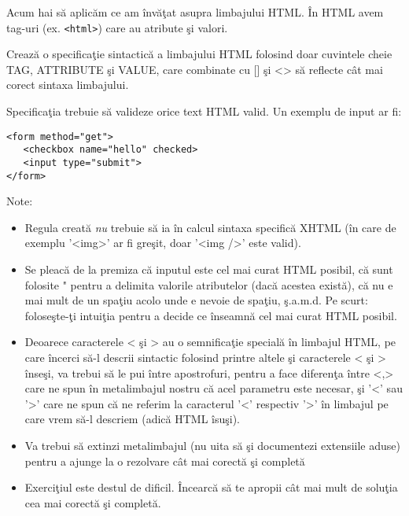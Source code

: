 \begin{Exercise}[title={Sintaxa HTML},label={ex:sintaxa_html},difficulty=3]
Acum hai să aplicăm ce am învăţat asupra limbajului HTML. În HTML avem
tag-uri (ex. \texttt{<html>}) care au atribute şi valori.

\Question Crează o specificaţie sintactică a limbajului HTML folosind
doar cuvintele cheie TAG, ATTRIBUTE şi VALUE, care combinate
cu [] şi <> să reflecte cât mai corect sintaxa limbajului.

Specificaţia trebuie să valideze orice text HTML valid.
Un exemplu de input ar fi:
\begin{verbatim}
<form method="get">
   <checkbox name="hello" checked>
   <input type="submit">
</form>
\end{verbatim}
\ExeText
Note:
\begin{itemize}
\item Regula creată \textit{nu} trebuie să ia în calcul sintaxa
specifică XHTML (în care de exemplu '<img>' ar fi greşit, doar '<img />' este valid).
\item Se pleacă de la premiza că inputul este cel mai curat HTML posibil, că
sunt folosite " pentru a delimita valorile atributelor (dacă acestea există), că
nu e mai mult de un spaţiu acolo unde e nevoie de spaţiu, ş.a.m.d. Pe scurt:
foloseşte-ţi intuiţia pentru a decide ce înseamnă {\glqq}cel mai curat HTML posibil{\grqq}.
\item Deoarece caracterele < şi > au o semnificaţie specială în limbajul HTML, pe
care încerci să-l descrii sintactic folosind printre altele
şi caracterele < şi > înseşi, va trebui să le pui între apostrofuri, pentru a face
diferenţa între <,> care ne spun în metalimbajul nostru
că acel parametru este necesar, şi '<' sau '>' care
ne spun că ne referim la caracterul '<' respectiv '>' în limbajul pe care
vrem să-l descriem (adică HTML îsuşi).
\item Va trebui să extinzi metalimbajul (nu uita să şi documentezi extensiile aduse)
pentru a ajunge la o rezolvare cât mai corectă şi completă
\item Exerciţiul este destul de dificil. Încearcă să te apropii cât mai mult de soluţia
cea mai corectă şi completă.
\end{itemize}
\end{Exercise}